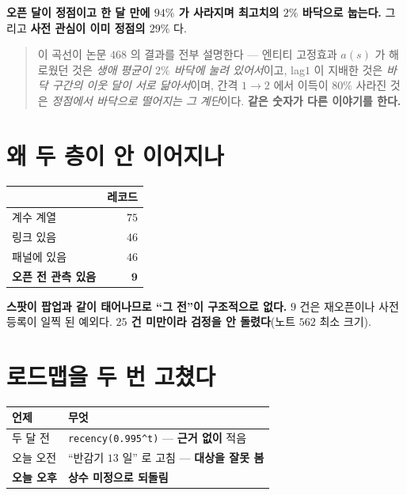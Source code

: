 \documentclass[11pt]{article}
\begin{document}
\textbf{오픈 달이 정점이고 한 달 만에 $94\%$ 가 사라지며 최고치의 $2\%$
바닥으로 눕는다.} 그리고 \textbf{사전 관심이 이미 정점의 $29\%$} 다.

\begin{quote}
이 곡선이 논문 $468$ 의 결과를 전부 설명한다 --- 엔티티 고정효과 $a(s)$ 가
해로웠던 것은 \emph{생애 평균이 $2\%$ 바닥에 눌려 있어서}이고, lag$1$ 이
지배한 것은 \emph{바닥 구간의 이웃 달이 서로 닮아서}이며, 간격 $1\!\to\!2$
에서 이득이 $80\%$ 사라진 것은 \emph{정점에서 바닥으로 떨어지는 그
계단}이다. \textbf{같은 숫자가 다른 이야기를 한다.}
\end{quote}

\section{왜 두 층이 안 이어지나}

\begin{center}
\begin{tabular}{lr}
\hline
 & 레코드 \\
\hline
계수 계열 & $75$ \\
링크 있음 & $46$ \\
패널에 있음 & $46$ \\
\textbf{오픈 전 관측 있음} & $\mathbf{9}$ \\
\hline
\end{tabular}
\end{center}

\textbf{스팟이 팝업과 같이 태어나므로 ``그 전''이 구조적으로 없다.}
$9$ 건은 재오픈이나 사전 등록이 일찍 된 예외다. \textbf{$25$ 건 미만이라
검정을 안 돌렸다}(노트 $562$ 최소 크기).

\section{로드맵을 두 번 고쳤다}

\begin{center}
\begin{tabular}{ll}
\hline
언제 & 무엇 \\
\hline
두 달 전 & \texttt{recency(0.995\^{}t)} --- \textbf{근거 없이} 적음 \\
오늘 오전 & ``반감기 $13$ 일'' 로 고침 --- \textbf{대상을 잘못 봄} \\
\textbf{오늘 오후} & \textbf{상수 미정으로 되돌림} \\
\hline
\end{tabular}
\end{center}
\end{document}
